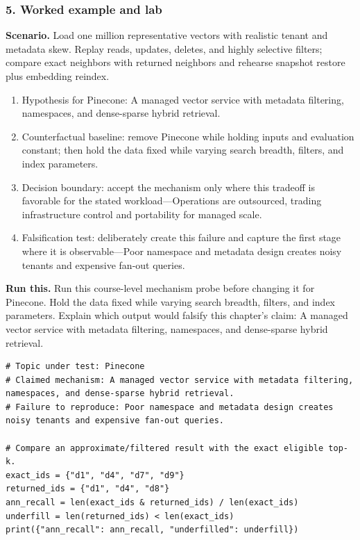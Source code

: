 \subsubsection*{5. Worked example and lab}
\textbf{Scenario.} Load one million representative vectors with realistic tenant and metadata skew. Replay reads, updates, deletes, and highly selective filters; compare exact neighbors with returned neighbors and rehearse snapshot restore plus embedding reindex.
\begin{enumerate}
\item Hypothesis for Pinecone: A managed vector service with metadata filtering, namespaces, and dense-sparse hybrid retrieval.
\item Counterfactual baseline: remove Pinecone while holding inputs and evaluation constant; then hold the data fixed while varying search breadth, filters, and index parameters.
\item Decision boundary: accept the mechanism only where this tradeoff is favorable for the stated workload—Operations are outsourced, trading infrastructure control and portability for managed scale.
\item Falsification test: deliberately create this failure and capture the first stage where it is observable—Poor namespace and metadata design creates noisy tenants and expensive fan-out queries.
\end{enumerate}
\textbf{Run this.} Run this course-level mechanism probe before changing it for Pinecone. Hold the data fixed while varying search breadth, filters, and index parameters. Explain which output would falsify this chapter's claim: A managed vector service with metadata filtering, namespaces, and dense-sparse hybrid retrieval.
\begin{Verbatim}[fontsize=\scriptsize]
# Topic under test: Pinecone
# Claimed mechanism: A managed vector service with metadata filtering, namespaces, and dense-sparse hybrid retrieval.
# Failure to reproduce: Poor namespace and metadata design creates noisy tenants and expensive fan-out queries.

# Compare an approximate/filtered result with the exact eligible top-k.
exact_ids = {"d1", "d4", "d7", "d9"}
returned_ids = {"d1", "d4", "d8"}
ann_recall = len(exact_ids & returned_ids) / len(exact_ids)
underfill = len(returned_ids) < len(exact_ids)
print({"ann_recall": ann_recall, "underfilled": underfill})
\end{Verbatim}
